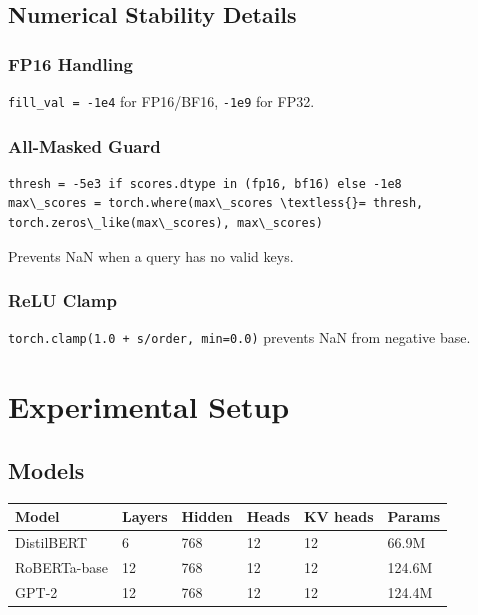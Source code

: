 \subsection{Numerical Stability Details}

\subsubsection{FP16 Handling}

\texttt{fill\_val = -1e4} for FP16/BF16, \texttt{-1e9} for FP32.

\subsubsection{All-Masked Guard}

\begin{lstlisting}
thresh = -5e3 if scores.dtype in (fp16, bf16) else -1e8
max\_scores = torch.where(max\_scores \textless{}= thresh, torch.zeros\_like(max\_scores), max\_scores)
\end{lstlisting}

Prevents NaN when a query has no valid keys.

\subsubsection{ReLU Clamp}

\texttt{torch.clamp(1.0 + s/order, min=0.0)} prevents NaN from negative base.



\section{Experimental Setup}

\subsection{Models}

\begin{table}[H]
\centering
\small
\begin{tabular}{llllll}
\toprule
\textbf{Model} & \textbf{Layers} & \textbf{Hidden} & \textbf{Heads} & \textbf{KV heads} & \textbf{Params} \\
\midrule
DistilBERT & 6 & 768 & 12 & 12 & 66.9M \\
RoBERTa-base & 12 & 768 & 12 & 12 & 124.6M \\
GPT-2 & 12 & 768 & 12 & 12 & 124.4M \\
\bottomrule
\end{tabular}
\end{table}

